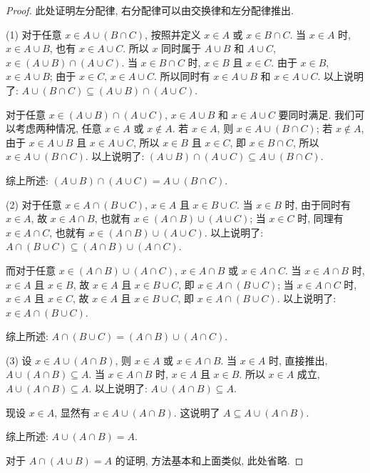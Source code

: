 \documentclass[UTF8]{ctexart}
\theoremstyle{mystyle}
\theoremstyle{myremark}
\theoremstyle{plain}
\begin{document}
\begin{proof}
    此处证明左分配律, 右分配律可以由交换律和左分配律推出.

    (1) 对于任意 $ x \in A \cup (B \cap C) $, 按照并定义 $ x \in A $ 或 $ x \in B \cap C $. 当 $ x \in A $ 时, $ x \in A \cup B $, 也有 $ x \in A \cup C $. 所以 $ x $ 同时属于 $ A \cup B $ 和 $ A \cup C $, $ x \in (A \cup B) \cap (A \cup C) $. 当 $ x \in B \cap C $ 时, $ x \in B $ 且 $ x \in C $. 由于 $ x \in B $, $ x \in A \cup B $; 由于 $ x \in C $, $ x \in A \cup C $. 所以同时有 $ x \in A \cup B $ 和 $ x \in A \cup C $. 以上说明了: $ A \cup (B \cap C) \subseteq (A \cup B) \cap (A \cup C) $.

    对于任意 $ x \in (A \cup B) \cap (A \cup C) $, $ x \in A \cup B $ 和 $ x \in A \cup C $ 要同时满足. 我们可以考虑两种情况, 任意 $ x \in A $ 或 $ x \notin A $. 若 $ x \in A $, 则 $ x \in A \cup (B \cap C) $; 若 $ x \notin A $, 由于 $ x \in A \cup B $ 且 $ x \in A \cup C $, 所以 $ x \in B $ 且 $ x \in C $, 即 $ x \in B \cap C $, 所以 $ x \in A \cup (B \cap C) $. 以上说明了: $ (A \cup B) \cap (A \cup C) \subseteq A \cup (B \cap C) $.

    综上所述: $ (A \cup B) \cap (A \cup C) = A \cup (B \cap C) $.

    (2) 对于任意 $ x \in A \cap (B \cup C) $, $ x \in A $ 且 $ x \in B \cup C $. 当 $ x \in B $ 时, 由于同时有 $ x \in A $, 故 $ x \in A \cap B $, 也就有 $ x \in (A \cap B) \cup (A \cup C) $; 当 $ x \in C $ 时, 同理有 $ x \in A \cap C $, 也就有 $ x \in (A \cap B) \cup (A \cup C) $. 以上说明了: $ A \cap (B \cup C) \subseteq (A \cap B) \cup (A \cap C) $.

    而对于任意 $ x \in (A \cap B) \cup (A \cap C) $, $ x \in A \cap B $ 或 $ x \in A \cap C $. 当 $ x \in A \cap B $ 时, $ x \in A $ 且 $ x \in B $, 故 $ x \in A $ 且 $ x \in B \cup C $, 即 $ x \in A \cap (B \cup C) $; 当 $ x \in A \cap C $ 时, $ x \in A $ 且 $ x \in C $, 故 $ x \in A $ 且 $ x \in B \cup C $, 即 $ x \in A \cap (B \cup C) $. 以上说明了: $ x \in A \cap (B \cup C) $.

    综上所述: $ A \cap (B \cup C) = (A \cap B) \cup (A \cap C) $.

    (3) 设 $ x \in A \cup (A \cap B) $, 则 $ x \in A $ 或 $ x \in A \cap B $. 当 $ x \in A $ 时, 直接推出, $ A \cup (A \cap B) \subseteq A $. 当 $ x \in A \cap B $ 时, $ x \in A $ 且 $ x \in B $. 所以 $ x \in A $ 成立, $ A \cup (A \cap B) \subseteq A $. 以上说明了: $ A \cup (A \cap B) \subseteq A $. 

    现设 $ x \in A $, 显然有 $ x \in A \cup (A \cap B) $. 这说明了 $ A \subseteq A \cup (A \cap B) $.

    综上所述: $ A \cup (A \cap B) = A $.

    对于 $ A \cap (A \cup B) = A $ 的证明, 方法基本和上面类似, 此处省略.
\end{proof}
\end{document}
